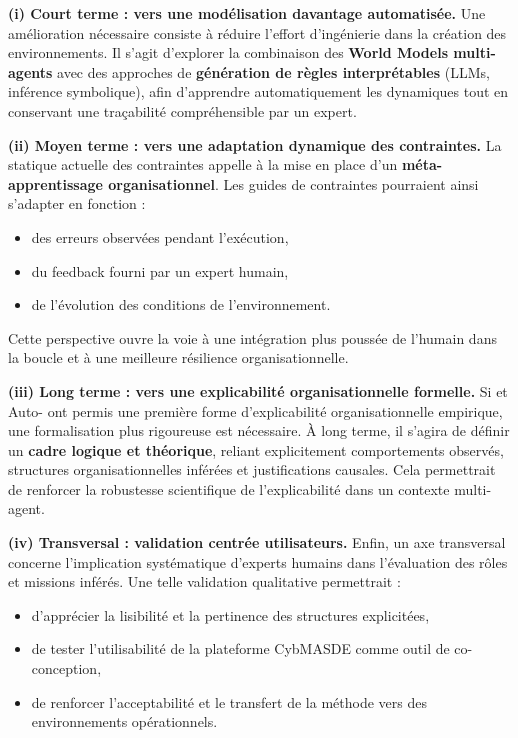 \medskip
\noindent
\textbf{(i) Court terme : vers une modélisation davantage automatisée.}
Une amélioration nécessaire consiste à réduire l'effort d'ingénierie dans la création des environnements.
Il s'agit d'explorer la combinaison des \textbf{World Models multi-agents} avec des approches de \textbf{génération de règles interprétables} (LLMs, inférence symbolique), afin d'apprendre automatiquement les dynamiques tout en conservant une traçabilité compréhensible par un expert.

\medskip
\noindent
\textbf{(ii) Moyen terme : vers une adaptation dynamique des contraintes.}
La statique actuelle des contraintes appelle à la mise en place d'un \textbf{méta-apprentissage organisationnel}.
Les guides de contraintes pourraient ainsi s'adapter en fonction :
\begin{itemize}
  \item des erreurs observées pendant l'exécution,
  \item du feedback fourni par un expert humain,
  \item de l'évolution des conditions de l'environnement.
\end{itemize}
Cette perspective ouvre la voie à une intégration plus poussée de l'humain dans la boucle et à une meilleure résilience organisationnelle.

\medskip
\noindent
\textbf{(iii) Long terme : vers une explicabilité organisationnelle formelle.}
Si  et Auto- ont permis une première forme d'explicabilité organisationnelle empirique, une formalisation plus rigoureuse est nécessaire.
À long terme, il s'agira de définir un \textbf{cadre logique et théorique}, reliant explicitement comportements observés, structures organisationnelles inférées et justifications causales.
Cela permettrait de renforcer la robustesse scientifique de l'explicabilité dans un contexte multi-agent.

\medskip
\noindent
\textbf{(iv) Transversal : validation centrée utilisateurs.}
Enfin, un axe transversal concerne l'implication systématique d'experts humains dans l'évaluation des rôles et missions inférés.
Une telle validation qualitative permettrait :
\begin{itemize}
  \item d'apprécier la lisibilité et la pertinence des structures explicitées,
  \item de tester l'utilisabilité de la plateforme CybMASDE comme outil de co-conception,
  \item de renforcer l'acceptabilité et le transfert de la méthode vers des environnements opérationnels.
\end{itemize}

